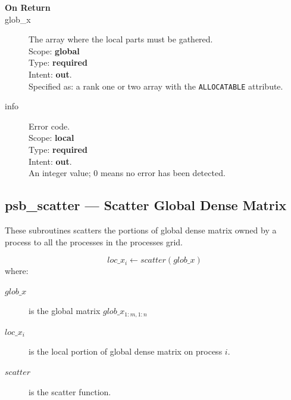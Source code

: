 \begin{description}
\item[\bf On Return] 
\item[glob\_x] The array where the local parts must be gathered.\\
Scope: {\bf global} \\
Type: {\bf required}\\
Intent: {\bf out}.\\
Specified as: a rank one or two array with the \verb|ALLOCATABLE| attribute.
\item[info] Error code.\\
Scope: {\bf local} \\
Type: {\bf required} \\
Intent: {\bf out}.\\
An integer value; 0 means no error has been detected. 
\end{description}

%
%

\clearpage\subsection{psb\_scatter --- Scatter Global Dense Matrix}

These subroutines scatters the portions of global dense matrix owned
by a process to all the processes in the processes grid.

\[ loc\_x_i \leftarrow scatter(glob\_x) \]
where:
\begin{description}
\item[$glob\_x$] is the global matrix $glob\_x_{1:m,1:n}$
\item[$loc\_x_i$] is the local portion of global dense matrix on
process $i$.
\item[$scatter$] is the scatter function.
\end{description}

